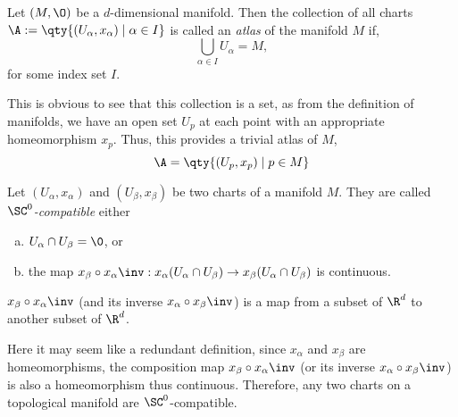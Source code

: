 \begin{definition}[Atlas]\label{def:atlas}
	Let \((M, \O)\) be a \(d\)-dimensional manifold. Then the collection of all charts \(\A := \qty{(U_\alpha, x_\alpha) \mid \alpha \in I}\) is called an \emph{atlas} of the manifold \(M\) if,
	\begin{equation}
		\bigcup_{\alpha \in I} U_\alpha = M,
	\end{equation}
	for some index set \(I\).
\end{definition}

This is obvious to see that this collection is a set, as from the definition of manifolds, we have an open set \(U_p\) at each point with an appropriate homeomorphism \(x_p\). Thus, this provides a trivial atlas of \(M\),
\begin{equation}
	\A = \qty{(U_p, x_p) \mid p \in M}
\end{equation}

\begin{definition}[\(\SC^0\)-Compatibility]
	Let \((U_\alpha, x_\alpha)\) and \((U_\beta, x_\beta)\) be two charts of a manifold \(M\). They are called \emph{\(\SC^0\)-compatible} either
	\begin{enumerate}[(a)]
		\item \(U_\alpha \cap U_\beta = \0\), or
		\item the map \(x_{\beta} \circ x_{\alpha}\inv: x_{\alpha}(U_{\alpha} \cap U_{\beta}) \to x_{\beta}(U_{\alpha} \cap U_{\beta})\) is continuous.
	\end{enumerate}
\end{definition}

\(x_{\beta} \circ x_{\alpha}\inv\) (and its inverse \(x_{\alpha} \circ x_{\beta}\inv\)) is a map from a subset of \(\R^d\) to another subset of \(\R^d\).
\begin{figure}[H]
	\centering
\end{figure} \noindent

Here it may seem like a redundant definition, since \(x_{\alpha}\) and \(x_{\beta}\) are homeomorphisms, the composition map \(x_{\beta} \circ x_{\alpha}\inv\) (or its inverse \(x_{\alpha} \circ x_{\beta}\inv\)) is also a homeomorphism thus continuous. Therefore, any two charts on a topological manifold are \(\SC^0\)-compatible.

